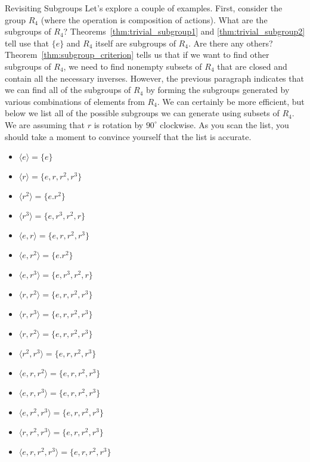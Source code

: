 \begin{section}{Revisiting Subgroups}
Let's explore a couple of examples.  First, consider the group \(R_4\) (where the operation is composition of actions).  What are the subgroups of \(R_4\)?  Theorems~\ref{thm:trivial_subgroup1} and \ref{thm:trivial_subgroup2} tell use that \(\{e\}\) and \(R_4\) itself are subgroups of \(R_4\).  Are there any others?  Theorem~\ref{thm:subgroup_criterion} tells us that if we want to find other subgroups of \(R_4\), we need to find nonempty subsets of \(R_4\) that are closed and contain all the necessary inverses.  However, the previous paragraph indicates that we can find all of the subgroups of \(R_4\) by forming the subgroups generated by various combinations of elements from \(R_4\).  We can certainly be more efficient, but below we list all of the possible subgroups we can generate using subsets of \(R_4\).  We are assuming that \(r\) is rotation by \(90^{\circ}\) clockwise.  As you scan the list, you should take a moment to convince yourself that the list is accurate.
\begin{multicols}{2}
\begin{itemize}
\item[] \(\langle e \rangle = \{e\}\)
\item[] \(\langle r \rangle  = \{e,r,r^2,r^3\}\)
\item[] \(\langle r^2 \rangle  = \{e.r^2\}\)
\item[] \(\langle r^3 \rangle  = \{e,r^3,r^2,r\}\)
\item[] \(\langle e,r \rangle  = \{e,r,r^2,r^3\}\)
\item[] \(\langle e,r^2 \rangle  = \{e.r^2\}\)
\item[] \(\langle e,r^3 \rangle  = \{e,r^3,r^2,r\}\)
\item[] \(\langle r,r^2 \rangle  = \{e,r,r^2,r^3\}\)
\item[] \(\langle r,r^3 \rangle  = \{e,r,r^2,r^3\}\)
\item[] \(\langle r,r^2 \rangle  = \{e,r,r^2,r^3\}\)
\item[] \(\langle r^2,r^3 \rangle  = \{e,r,r^2,r^3\}\)
\item[] \(\langle e,r,r^2 \rangle  = \{e,r,r^2,r^3\}\)
\item[] \(\langle e,r,r^3 \rangle  = \{e,r,r^2,r^3\}\)
\item[] \(\langle e,r^2,r^3 \rangle  = \{e,r,r^2,r^3\}\)
\item[] \(\langle r,r^2,r^3 \rangle  = \{e,r,r^2,r^3\}\)
\item[] \(\langle e,r,r^2,r^3 \rangle = \{e,r,r^2,r^3\}\)
\end{itemize}

\end{multicols}
\end{section}
